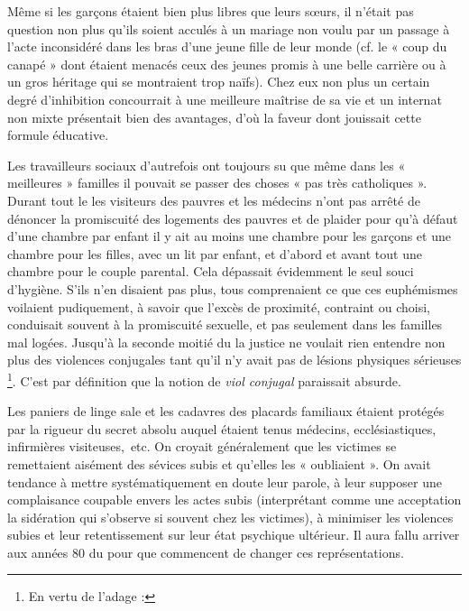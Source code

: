  Même si les garçons étaient bien plus libres que leurs sœurs, il n'était pas question non plus qu'ils soient acculés à un mariage non voulu par un passage à l'acte inconsidéré dans les bras d'une jeune fille de leur monde (cf. le « coup du canapé » dont étaient menacés ceux des jeunes promis à une belle carrière ou à un gros héritage qui se montraient trop naïfs). Chez eux non plus un certain degré d'inhibition concourrait à une meilleure maîtrise de sa vie et un internat non mixte présentait bien des avantages, d'où la faveur dont jouissait cette formule éducative.
 
  
 
 Les travailleurs sociaux d'autrefois ont toujours su que même dans les « meilleures » familles il pouvait se passer des choses « pas très catholiques ». Durant tout le  les visiteurs des pauvres et les médecins n'ont pas arrêté de dénoncer la promiscuité des logements des pauvres et de plaider pour qu'à défaut d'une chambre par enfant il y ait au moins une chambre pour les garçons et une chambre pour les filles, avec un lit par enfant, et d'abord et avant tout une chambre pour le couple parental. Cela dépassait évidemment le seul souci d'hygiène. S'ils n'en disaient pas plus, tous comprenaient ce que ces euphémismes voilaient pudiquement, à savoir que l'excès de proximité, contraint ou choisi, conduisait souvent à la promiscuité sexuelle, et pas seulement dans les familles mal logées. Jusqu'à la seconde moitié du  la justice ne voulait rien entendre non plus des violences conjugales tant qu'il n'y avait pas de lésions physiques sérieuses
\footnote{En vertu de l'adage : }. C'est par définition que la notion de \emph{viol conjugal} paraissait absurde.
 
Les paniers de linge sale et les cadavres des placards familiaux étaient protégés par la rigueur du secret absolu auquel étaient tenus médecins, ecclésiastiques, infirmières visiteuses,~etc. On croyait généralement que les victimes se remettaient aisément des sévices subis et qu'elles les « oubliaient ». On avait tendance à mettre systématiquement en doute leur parole, à leur supposer une complaisance coupable envers les actes subis (interprétant comme une acceptation la sidération qui s'observe si souvent chez les victimes), à minimiser les violences subies et leur retentissement sur leur état psychique ultérieur. Il aura fallu arriver aux années 80 du  pour que commencent de changer ces représentations.
 

 

 

 

 
